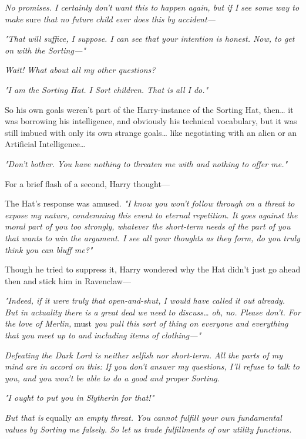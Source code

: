 \emph{No promises. I certainly don't want this to happen again, but if I see some way to make} sure\emph{ that no future child ever does this by accident---}

\emph{"That will suffice, I suppose. I can see that your intention is honest. Now, to get on with the Sorting---"}

\emph{Wait! What about all my other questions?}

\emph{"I am the Sorting Hat. I Sort children. That is all I do."}

So his own goals weren't part of the Harry-instance of the Sorting Hat, then{\ldots} it was borrowing his intelligence, and obviously his technical vocabulary, but it was still imbued with only its own strange goals{\ldots} like negotiating with an alien or an Artificial Intelligence{\ldots}

\emph{"Don't bother. You have nothing to threaten me with and nothing to offer me."}

For a brief flash of a second, Harry thought---

The Hat's response was amused. \emph{"I know you won't follow through on a threat to expose my nature, condemning this event to eternal repetition. It goes against the moral part of you too strongly, whatever the short-term needs of the part of you that wants to win the argument. I see all your thoughts as they form, do you truly think you can bluff me?"}

Though he tried to suppress it, Harry wondered why the Hat didn't just go ahead then and stick him in Ravenclaw---

\emph{"Indeed, if it were truly that open-and-shut, I would have called it out already. But in actuality there is a great deal we need to discuss{\ldots} oh, no. Please don't. For the love of Merlin,} must\emph{ you pull this sort of thing on everyone and everything that you meet up to and including items of clothing---"}

\emph{Defeating the Dark Lord is neither selfish nor short-term. All the parts of my mind are in accord on this: If you don't answer my questions, I'll refuse to talk to you, and you won't be able to do a good and proper Sorting.}

\emph{"I ought to put you in Slytherin for that!"}

\emph{But that is} equally\emph{ an empty threat. You cannot fulfill your own fundamental values by Sorting me falsely. So let us trade fulfillments of our utility functions.}

